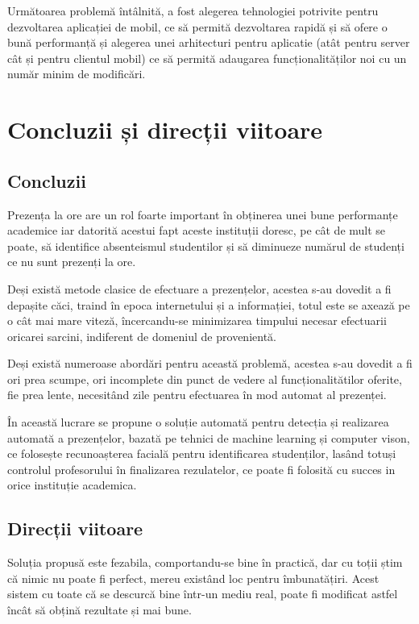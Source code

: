 \documentclass[a4paper, 12pt]{article}
\begin{document}
	Următoarea problemă întâlnită, a fost alegerea tehnologiei potrivite pentru dezvoltarea aplicației de mobil, ce să permită dezvoltarea rapidă și să ofere o bună performanță și alegerea unei arhitecturi pentru aplicatie (atât pentru server cât și pentru clientul mobil) ce să permită adaugarea funcționalităților noi cu un număr minim de modificări.   
	
	
	\newpage
	\section{Concluzii și direcții viitoare}
	\bigskip
	
	\subsection{Concluzii}
	
	
	\quad\space Prezența la ore are un rol foarte important în obținerea unei bune performanțe academice iar datorită acestui fapt aceste instituții doresc, pe cât de mult se poate, să identifice absenteismul studentilor și să diminueze  numărul de studenți ce nu sunt prezenți la ore. 
	
	Deși există metode clasice de efectuare a prezențelor, acestea s-au dovedit a fi depașite căci, traind în epoca internetului și a informației, totul este se axează pe o cât mai mare viteză, încercandu-se minimizarea timpului necesar efectuarii oricarei sarcini, indiferent de domeniul de provenientă.
	
	Deși există numeroase abordări pentru această problemă, acestea s-au dovedit a fi ori prea scumpe, ori incomplete din punct de vedere al funcționalitătilor oferite, fie prea lente, necesitând zile pentru efectuarea în mod automat al prezenței.
	
	În această lucrare se propune o soluție automată pentru detecția și realizarea automată a prezențelor, bazată pe tehnici de machine learning și computer vison, ce folosește recunoașterea facială pentru identificarea studenților, lasând totuși controlul profesorului în finalizarea rezulatelor, ce poate fi folosită cu succes in orice instituție academica.
	
	
	\subsection{Direcții viitoare}
	
	\quad\space Soluția propusă este fezabila, comportandu-se bine în practică, dar cu toții știm că nimic nu poate fi perfect, mereu existând loc pentru îmbunatățiri. Acest sistem cu toate că se descurcă bine într-un mediu real, poate fi modificat astfel încât să obțină rezultate și mai bune.
	
\end{document}
